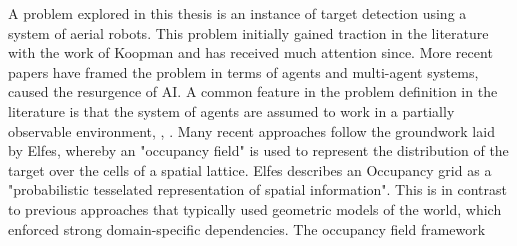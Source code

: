 \workinprogress

A problem explored in this thesis is an instance of target detection using a system of aerial robots. This problem initially gained traction in the literature with the work of Koopman \cite{KoopmanTheoryOfSearchTargetDetection} and has received much attention since. More recent papers have framed the problem in terms of agents and multi-agent systems, caused the resurgence of AI. A common feature in the problem definition in the literature is that the system of agents are assumed to work in a partially observable environment\cite{Symington2010ProbabilisticUAVs}, \cite{Chung2008Multi-agentFramework}, \cite{WongMulti-vehicleTargets}. Many recent approaches follow the groundwork laid by Elfes\cite{ElfesUsingNavigation}, whereby an "occupancy field" is used to represent the distribution of the target over the cells of a spatial lattice. Elfes describes an Occupancy grid as a "probabilistic tesselated representation of spatial information". This is in contrast to previous approaches that typically used geometric models of the world, which enforced strong domain-specific dependencies. The occupancy field framework 
\par